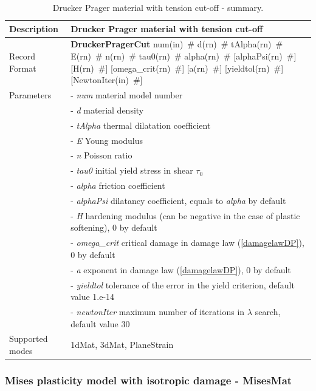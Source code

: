 \documentclass[a4paper]{article}
\newcommand{\descitem}[1]{{\noindent \bf #1}}
\newcommand{\elemparam}[2]{{{#1\tiny (#2)}~\#}}
\newcommand{\param}[1]{{\it #1}}
\begin{document}
\begin{table}[!htb]
\begin{tabular}{|l|p{9cm}|}
\hline
Description & Drucker Prager material with tension cut-off\\
\hline
Record Format & \descitem{DruckerPragerCut} \elemparam{num}{in}
\elemparam{d}{rn} \elemparam{tAlpha}{rn} \elemparam{E}{rn} \elemparam{n}{rn} \elemparam{tau0}{rn} \elemparam{alpha}{rn} [\elemparam{alphaPsi}{rn}] [\elemparam{H}{rn}] [\elemparam{omega\_crit}{rn}] [\elemparam{a}{rn}] [\elemparam{yieldtol}{rn}] [\elemparam{NewtonIter}{in}]\\
Parameters &- \param{num} material model number\\
&- \param{d} material density\\
&- \param{tAlpha} thermal dilatation coefficient\\
&- \param{E} Young modulus\\
&- \param{n} Poisson ratio\\
&- \param{tau0} initial yield stress in shear $\tau_0$\\
&- \param{alpha} friction coefficient\\
&- \param{alphaPsi} dilatancy coefficient, equals to \param{alpha} by default\\
&- \param{H} hardening modulus (can be negative in the case of plastic softening), 0 by default\\ 
&- \param{omega\_crit} critical damage in damage law (\ref{damagelawDP}), 0 by default\\
&- \param{a} exponent in damage law (\ref{damagelawDP}), 0 by default\\
&- \param{yieldtol} tolerance of the error in the yield criterion, default value
1.e-14\\
&- \param{newtonIter} maximum number of iterations in $\lambda$ search, default value 30\\
Supported modes& 1dMat, 3dMat, PlaneStrain\\
\hline
\end{tabular}
\caption{Drucker Prager material with tension cut-off - summary.}
\label{DP_table}
\end{table}

\clearpage
\subsubsection{Mises plasticity model with isotropic damage - MisesMat}
\label{sec:misplast}
\end{document}
